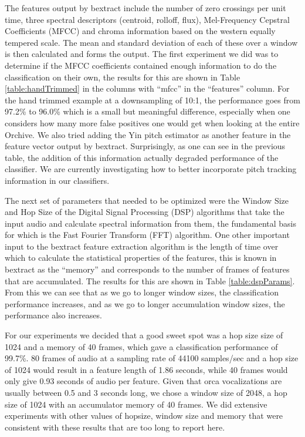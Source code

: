 The features output by bextract include the number of zero crossings
per unit time, three spectral descriptors (centroid, rolloff, flux),
Mel-Frequency Cepstral Coefficients (MFCC) and chroma information
based on the western equally tempered scale.  The mean and standard
deviation of each of these over a window is then calculated and forms
the output.  The first experiment we did was to determine if the MFCC
coefficients contained enough information to do the classification on
their own, the results for this are shown in Table
\ref{table:handTrimmed} in the columns with ``mfcc'' in the
``features'' column.  For the hand trimmed example at a downsampling
of 10:1, the performance goes from 97.2\% to 96.0\% which is a small
but meaningful difference, especially when one considers how many more
false positives one would get when looking at the entire Orchive.  We
also tried adding the Yin pitch estimator as another feature in the
feature vector output by bextract.  Surprisingly, as one can see in
the previous table, the addition of this information actually degraded
performance of the classifier.  We are currently investigating how to
better incorporate pitch tracking information in our classifiers.

The next set of parameters that needed to be optimized were the Window
Size and Hop Size of the Digital Signal Processing (DSP) algorithms
that take the input audio and calculate spectral information from
them, the fundamental basis for which is the Fast Fourier Transform
(FFT) algorithm.  One other important input to the bextract feature
extraction algorithm is the length of time over which to calculate the
statistical properties of the features, this is known in bextract as
the ``memory'' and corresponds to the number of frames of features
that are accumulated.  The results for this are shown in Table
\ref{table:dspParams}.  From this we can see that as we go to longer
window sizes, the classification performance increases, and as we go
to longer accumulation window sizes, the performance also increases.

For our experiments we decided that a good sweet spot was a hop size
size of 1024 and a memory of 40 frames, which gave a classification
performance of 99.7\%.  80 frames of audio at a sampling rate of 44100
samples/sec and a hop size of 1024 would result in a feature length of
1.86 seconds, while 40 frames would only give 0.93 seconds of audio
per feature.  Given that orca vocalizations are usually between 0.5
and 3 seconds long, we chose a window size of 2048, a hop size of 1024
with an accumulator memory of 40 frames.  We did extensive experiments
with other values of hopsize, window size and memory that were
consistent with these results that are too long to report here.

